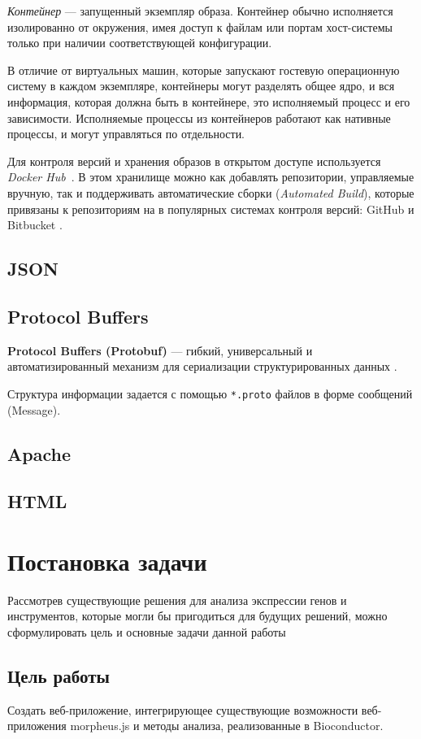 \documentclass[annotation,specification]{itmo-student-thesis}
\begin{document}
\textit{Контейнер} --- запущенный экземпляр образа. Контейнер обычно исполняется изолированно от окружения, имея доступ к файлам или портам хост-системы только при наличии соответствующей конфигурации.

В отличие от виртуальных машин, которые запускают гостевую операционную систему в каждом экземпляре, контейнеры могут разделять общее ядро, и вся информация, которая должна быть в контейнере, это исполняемый процесс и его зависимости. Исполняемые процессы из контейнеров работают как нативные процессы, и могут управляться по отдельности. 

Для контроля версий и хранения образов в открытом доступе используется \emph{Docker Hub}~\cite{dhub}. В этом хранилище можно как добавлять репозитории, управляемые вручную, так и поддерживать автоматические сборки (\textit{Automated Build}), которые привязаны к репозиториям на в популярных системах контроля версий: GitHub \cite{github} и Bitbucket \cite{bitbucket}.

\subsection{JSON}

\subsection{Protocol Buffers}
\textbf{Protocol Buffers (Protobuf)} --- гибкий, универсальный и автоматизированный механизм для сериализации структурированных данных \cite{protobuf}.

Структура информации задается с помощью \texttt{*.proto} файлов в форме сообщений (Message).

\subsection{Apache}
\subsection{HTML}

\section{Постановка задачи}
Рассмотрев существующие решения для анализа экспрессии генов и инструментов, которые могли бы пригодиться для будущих решений, можно сформулировать цель и основные задачи данной работы

\subsection{Цель работы}
Создать веб-приложение, интегрирующее существующие возможности веб-приложения morpheus.js и методы анализа, реализованные в Bioconductor.
\end{document}
